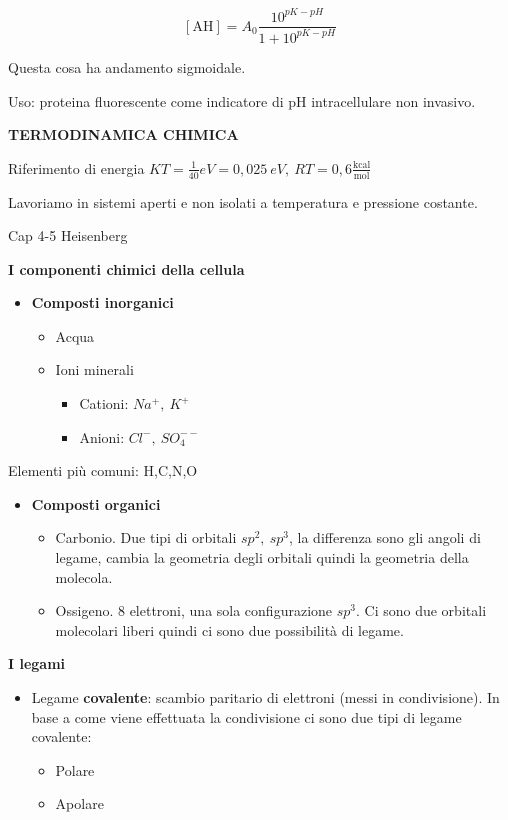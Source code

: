 \[\left\lbrack \text{AH} \right\rbrack = A_{0}\frac{10^{pK - pH}}{1 + 10^{pK - pH}}\]

Questa cosa ha andamento sigmoidale.

Uso: proteina fluorescente come indicatore di pH intracellulare non
invasivo.

\textbf{TERMODINAMICA CHIMICA}

Riferimento di energia
\(KT = \frac{1}{40}eV = 0,025\ eV,\ RT = 0,6\frac{\text{kcal}}{\text{mol}}\)

Lavoriamo in sistemi aperti e non isolati a temperatura e pressione
costante.

Cap 4-5 Heisenberg

\textbf{I componenti chimici della cellula}

\begin{itemize}
\item
  \textbf{Composti inorganici}

  \begin{itemize}
  \item
    Acqua
  \item
    Ioni minerali

    \begin{itemize}
    \item
      Cationi: \(Na^{+},\ K^{+}\)
    \item
      Anioni: \(Cl^{-},\ SO_{4}^{- -}\)
    \end{itemize}
  \end{itemize}
\end{itemize}

Elementi più comuni: H,C,N,O

\begin{itemize}
\item
  \textbf{Composti organici}

  \begin{itemize}
  \item
    Carbonio. Due tipi di orbitali \(sp^{2},\ sp^{3}\), la differenza
    sono gli angoli di legame, cambia la geometria degli orbitali quindi
    la geometria della molecola.
  \item
    Ossigeno. 8 elettroni, una sola configurazione \(sp^{3}\). Ci sono
    due orbitali molecolari liberi quindi ci sono due possibilità di
    legame.
  \end{itemize}
\end{itemize}

\textbf{I legami}

\begin{itemize}
\item
  Legame \textbf{covalente}: scambio paritario di elettroni (messi in
  condivisione). In base a come viene effettuata la condivisione ci sono
  due tipi di legame covalente:

  \begin{itemize}
  \item
    Polare
  \item
    Apolare
  \end{itemize}
\end{itemize}

